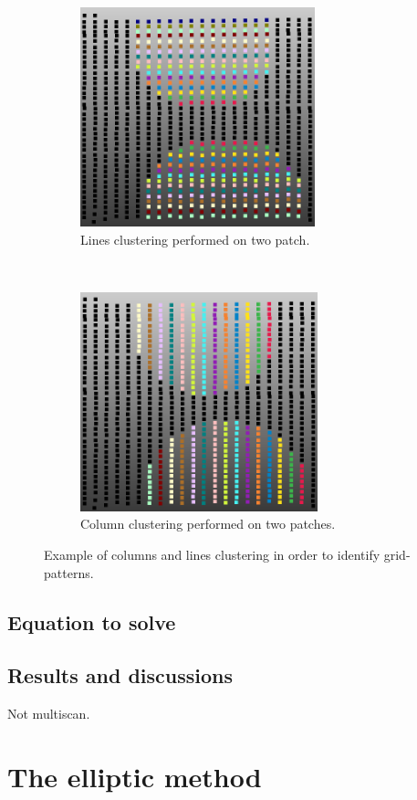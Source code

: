 \begin{figure}[t!]
  \centering
    \begin{subfigure}[t]{0.5\textwidth}
      \centering
        \includegraphics[height=2.5in]{img/grid-lines.png}
        \caption{Lines clustering performed on two patch.}
    \end{subfigure}%
    ~
    \begin{subfigure}[t]{0.5\textwidth}
      \centering
        \includegraphics[height=2.5in]{img/grid-cols.png}
        \caption{Column clustering performed on two patches.}
    \end{subfigure}
    \caption{Example of columns and lines clustering in order to identify grid-patterns.}
    \label{fig:line-col-cluster}
\end{figure}

\subsection{Equation to solve}
\label{subsc:eq}


\subsection{Results and discussions}
Not multiscan.


\section{The elliptic method}
\label{sc:elliptic}

